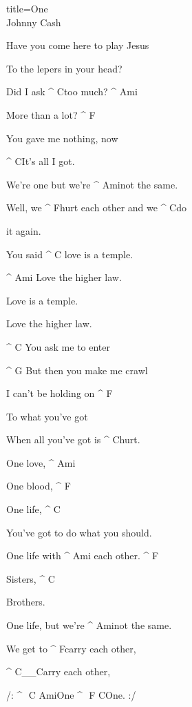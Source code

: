 \begin{song}{title=\predtitle\centering One \\\large Johnny Cash  \vspace*{-.3cm}}
\begin{centerjustified}
\begin{varwidth}[t]{0.55\textwidth}
	Have you come here to play Jesus

	To the lepers in your head?

	Did I ask ^{ C}too much? ^{ Ami}

	More than a lot? ^{ F}

	You gave me nothing, now
	   
	^{ C}It's all I got.

	We're one but we're ^{ Ami}not the same.

	Well, we ^{ F}hurt each other and we ^{ C}do

	it again.

	You said ^{ C \z}love is a temple.

	^{ Ami\,\,}Love the higher law.

	Love is a temple.	

	Love the higher law.

	^{ C \z}You ask me to enter

	^{ G\,\,}But then you make me crawl

	I can't be holding on ^{ F}
                  
	To what you've got

	When all you've got is ^{ C}hurt.


\end{varwidth}
\end{centerjustified}
\newpage
\begin{centerjustified}
\begin{varwidth}[t]{0.57\textwidth}\setlength{\parindent}{0.45cm}  %



\end{varwidth}\mezisloupci\begin{varwidth}[t]{0.55\textwidth}\setlength{\parindent}{0.45cm}

	One love, ^{ Ami}

	One blood, ^{ F}

	One life, ^{ C}
 
	You've got to do what you should.

	One life with ^{ Ami\,\,}each other. ^{ F}
 
 	Sisters, ^{ C}
 
	Brothers.
   
	One life, but we're ^{ Ami}not the same.

	We get to ^{ F}carry each other,

  	^{ C{\color{white}\_\_}}Carry each other,

  	/: ^{ \,\,C\,\,Ami}One ^{ \,\,F\,\,C}One. :/


\end{varwidth}
\end{centerjustified}

\setcounter{Slokočet}{0}
\end{song}
